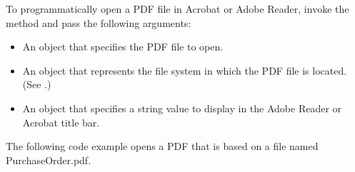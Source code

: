 \documentclass[letterpaper,12pt,english,openany,oneside]{sphinxmanual}
\begin{document}
To programmatic\sphinxhyphen{}ally open a PDF file in Acrobat or Adobe Reader, invoke the  method and pass the following arguments:
\begin{itemize}
\item {} 
An  object that specifies the PDF file to open.

\item {} 
An  object that represents the file system in which the PDF file is located. (See .)

\item {} 
An  object that specifies a string value to display in the Adobe Reader or Acrobat title bar.

\end{itemize}

The following code example opens a PDF that is based on a file named PurchaseOrder.pdf.
\end{document}

